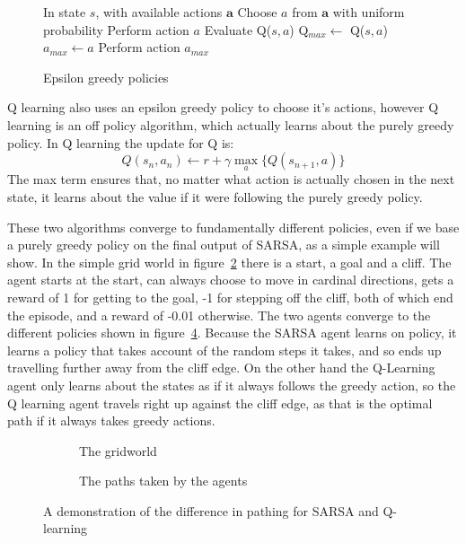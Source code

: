 \begin{figure}
\centering
\begin{algorithmic}
\State In state $s$, with available actions $\boldsymbol{a}$
\WithP[$\epsilon$]
	\State Choose $a$ from $\boldsymbol{a}$ with uniform probability
	\State Perform action $a$
\ElseP
		\State Evaluate Q($s,a$)
			\State Q$_{max} \gets $ Q($s,a$)
			\State $a_{max} \gets a$
		\EndIf
	\EndFor
	\State Perform action $a_{max}$
\EndP
\end{algorithmic}
\caption{Epsilon greedy policies}
\label{alg:epsgreedy}
\end{figure}

Q learning also uses an epsilon greedy policy to choose it's actions, however Q learning is an off policy algorithm, which actually learns about the purely greedy policy. In Q learning the update for Q is:
\begin{equation}
Q(s_n,a_n) \gets r + \gamma \max_a \{Q(s_{n+1}, a) \}
\end{equation}
The max term ensures that, no matter what action is actually chosen in the next state, it learns about the value if it were following the purely greedy policy.

These two algorithms converge to fundamentally different policies, even if we base a purely greedy policy on the final output of SARSA, as a simple example will show. In the simple grid world in figure~\ref{fig:gridworld} there is a start, a goal and a cliff. The agent starts at the start, can always choose to move in cardinal directions, gets a reward of 1 for getting to the goal, -1 for stepping off the cliff, both of which end the episode, and  a reward of -0.01 otherwise. The two agents converge to the different policies shown in figure~\ref{fig:gridworldpaths}. Because the SARSA agent learns on policy, it learns a policy that takes account of the random steps it takes, and so ends up travelling further away from the cliff edge. On the other hand the Q-Learning agent only learns about the states as if it always follows the greedy action, so the Q learning agent travels right up against the cliff edge, as that is the optimal path if it always takes greedy actions.

\begin{figure}
\begin{subfigure}{0.5\textwidth}

\caption{The gridworld}
\label{fig:gridworld}
\end{subfigure}
\begin{subfigure}{0.5\textwidth}

\caption{The paths taken by the agents}
\label{fig:gridworldpaths}
\end{subfigure}
\caption{A demonstration of the difference in pathing for SARSA and Q-learning}
\end{figure}

